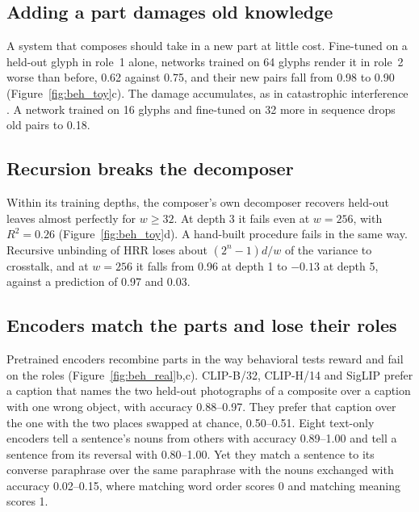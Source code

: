 \documentclass[10pt]{article}
\theoremstyle{plain}
\theoremstyle{remark}
\begin{document}
\subsection{Adding a part damages old knowledge}
\label{sec:adding}

A system that composes should take in a new part at little cost. Fine-tuned on a held-out glyph in role~1 alone, networks trained on 64 glyphs render it in role~2 worse than before, 0.62 against 0.75, and their new pairs fall from 0.98 to 0.90 (Figure~\ref{fig:beh_toy}c). The damage accumulates, as in catastrophic interference \citep{mccloskey1989,french1999}. A network trained on 16 glyphs and fine-tuned on 32 more in sequence drops old pairs to 0.18.

\subsection{Recursion breaks the decomposer}
\label{sec:depth}

Within its training depths, the composer's own decomposer recovers held-out leaves almost perfectly for $w \ge 32$. At depth 3 it fails even at $w = 256$, with $R^2 = 0.26$ (Figure~\ref{fig:beh_toy}d). A hand-built procedure fails in the same way. Recursive unbinding of HRR loses about $(2^n - 1)d/w$ of the variance to crosstalk, and at $w = 256$ it falls from 0.96 at depth 1 to $-0.13$ at depth 5, against a prediction of 0.97 and 0.03.

\subsection{Encoders match the parts and lose their roles}
\label{sec:beh_encoders}

Pretrained encoders recombine parts in the way behavioral tests reward and fail on the roles (Figure~\ref{fig:beh_real}b,c). CLIP-B/32, CLIP-H/14 and SigLIP prefer a caption that names the two held-out photographs of a composite over a caption with one wrong object, with accuracy 0.88--0.97. They prefer that caption over the one with the two places swapped at chance, 0.50--0.51. Eight text-only encoders tell a sentence's nouns from others with accuracy 0.89--1.00 and tell a sentence from its reversal with 0.80--1.00. Yet they match a sentence to its converse paraphrase over the same paraphrase with the nouns exchanged with accuracy 0.02--0.15, where matching word order scores 0 and matching meaning scores 1.
\end{document}
